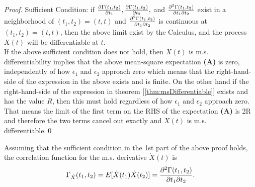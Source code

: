 \begin{proof}
Sufficient Condition: if ${\partial \Gamma(t_1, t_2)\over \partial t_1},  {\partial \Gamma(t_1, t_2)\over \partial t_2},$ and ${ \partial^2\Gamma(t_1, t_2)\over \partial t_1 \partial t_2}$ exist in a neighborhood of $(t_1, t_2) = (t,t)$ and ${\partial^2  \Gamma(t_1, t_2) \over \partial t_1 \partial t_2}$ is continuous at $(t_1, t_2) = (t, t)$, then the above limit exist by the Calculus, and the process $X(t)$ will be differentiable at $t$.\\

If the above sufficient condition does not hold, then $X(t)$ is m.s. differentiability implies that the above mean-square expectation {\bf (A)} is zero, independently of how $\epsilon_1$ and $\epsilon_2$ approach zero which means that the right-hand-side of the expression in the above exists and is finite. On the other hand if the right-hand-side of the expression in theorem [\ref{thm:msDifferentiable}] exists and has the value $R$, then this must hold regardless of how $\epsilon_1$ and $\epsilon_2$ approach zero. That means the limit of the first term on the RHS of the expectation {\bf (A)} is 2R and therefore the two terms cancel out exactly and $X(t)$ is m.s. differentiable.\qed
\end{proof}

Assuming that the sufficient condition in the 1st part of the above proof holds, the correlation function for the m.s. derivative $\dot{X}(t)$ is
$$\Gamma_{\dot{X}} (t_1, t_2) = E[\dot{X}(t_1) \dot{X}(t_2)]  = {\partial^2 \Gamma(t_1, t_2)\over \partial t_1 \partial t_2}.$$

